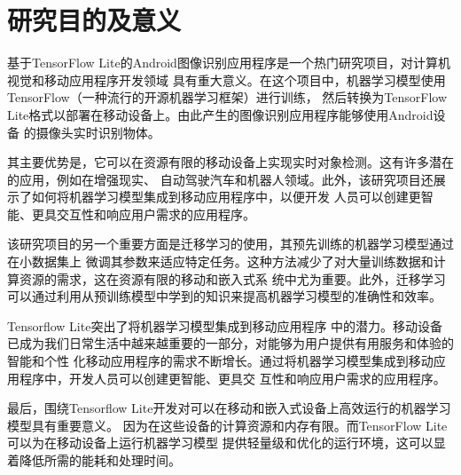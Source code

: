 %
%
%
%

\section{研究目的及意义}
基于TensorFlow Lite的Android图像识别应用程序是一个热门研究项目，对计算机视觉和移动应用程序开发领域
具有重大意义。在这个项目中，机器学习模型使用TensorFlow（一种流行的开源机器学习框架）进行训练，
然后转换为TensorFlow Lite格式以部署在移动设备上。由此产生的图像识别应用程序能够使用Android设备
的摄像头实时识别物体。

其主要优势是，它可以在资源有限的移动设备上实现实时对象检测。这有许多潜在的应用，例如在增强现实、
自动驾驶汽车和机器人领域。此外，该研究项目还展示了如何将机器学习模型集成到移动应用程序中，以便开发
人员可以创建更智能、更具交互性和响应用户需求的应用程序。

该研究项目的另一个重要方面是迁移学习的使用，其预先训练的机器学习模型通过在小数据集上
微调其参数来适应特定任务。这种方法减少了对大量训练数据和计算资源的需求，这在资源有限的移动和嵌入式系
统中尤为重要。此外，迁移学习可以通过利用从预训练模型中学到的知识来提高机器学习模型的准确性和效率。

Tensorflow Lite突出了将机器学习模型集成到移动应用程序
中的潜力。移动设备已成为我们日常生活中越来越重要的一部分，对能够为用户提供有用服务和体验的智能和个性
化移动应用程序的需求不断增长。通过将机器学习模型集成到移动应用程序中，开发人员可以创建更智能、更具交
互性和响应用户需求的应用程序。

最后，围绕Tensorflow Lite开发对可以在移动和嵌入式设备上高效运行的机器学习模型具有重要意义。
因为在这些设备的计算资源和内存有限。而TensorFlow Lite 可以为在移动设备上运行机器学习模型
提供轻量级和优化的运行环境，这可以显着降低所需的能耗和处理时间。